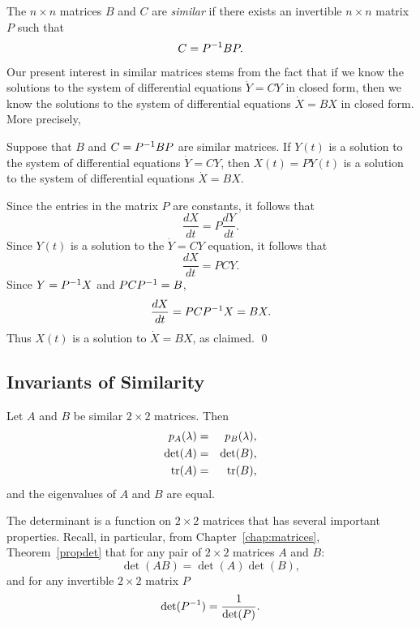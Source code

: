 \begin{Def}  \label{D:similar}
The $n\times n$ matrices $B$ and $C$ are {\em similar\/} if
there exists an invertible $n\times n$ matrix $P$ such that
\[
C = P^{-1} BP.
\]
\end{Def}  

Our present interest in similar matrices stems from the fact that if we
know the solutions to the system of differential equations $\dot{Y}=CY$ in
closed form, then we know the solutions to the system of differential
equations $\dot{X}=BX$ in closed form.  More precisely,
\begin{lemma}  \label{L:simsoln}
Suppose that $B$ and $C=P^{-1} BP$ are similar matrices.  If
$Y(t)$ is a solution to the system of differential equations
$\dot{Y}=CY$, then $X(t)=PY(t)$ is a solution to the system of 
differential equations $\dot{X}=BX$.
\end{lemma}

\proof   Since the entries in the matrix $P$ are constants, it follows that
\[
\frac{dX}{dt} = P\frac{dY}{dt}.
\]
Since $Y(t)$ is a solution to the $\dot{Y}=CY$ equation, it follows that
\[
\frac{dX}{dt} = PCY.
\]
Since $Y=P^{-1} X$ and $PCP^{-1} = B$,
\[
\frac{dX}{dt} = PCP^{-1} X = BX.
\]
Thus $X(t)$ is a solution to $\dot{X}=BX$, as claimed.  \qed


\subsection*{Invariants of Similarity}

\begin{lemma}  \label{L:simdettr}
Let $A$ and $B$ be similar $2\times 2$ matrices.  Then
\begin{eqnarray*}
p_A(\lambda) & = & p_B(\lambda),\\
\det(A) & = & \det(B),\\
{\rm tr}(A) & = & {\rm tr}(B),
\end{eqnarray*} 
and the eigenvalues of $A$ and $B$ are equal.
\end{lemma}

\proof
The determinant is a function on $2\times 2$ matrices
that has several important properties.  Recall, in particular, from
Chapter~\ref{chap:matrices}, Theorem~\ref{propdet} that for any pair of
$2\times 2$ matrices $A$ and $B$:
\begin{equation} \label{e:detprod}
\det(AB) =  \det(A)\det(B),
\end{equation}
and for any invertible $2\times 2$ matrix $P$
\begin{equation}  \label{e:detinv}
\det(P^{-1})  =  \frac{1}{\det(P)}.
\end{equation}


